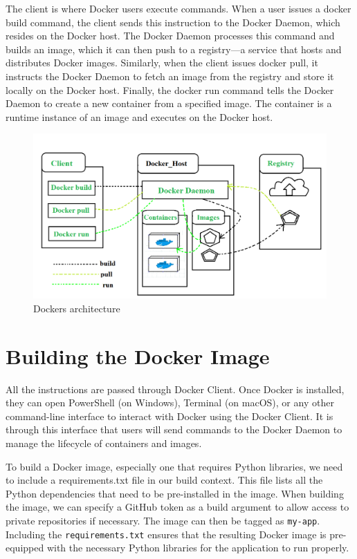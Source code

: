 \documentclass{article}
\begin{document}
The client is where Docker users execute commands. When a user issues a docker build command, the client sends this instruction to the Docker Daemon, which resides on the Docker host. The Docker Daemon processes this command and builds an image, which it can then push to a registry—a service that hosts and distributes Docker images. Similarly, when the client issues docker pull, it instructs the Docker Daemon to fetch an image from the registry and store it locally on the Docker host. Finally, the docker run command tells the Docker Daemon to create a new container from a specified image. The container is a runtime instance of an image and executes on the Docker host.

\begin{figure}[H]
\includegraphics[scale=.37]{figures/docker_architecture.png}
\caption{Dockers architecture \cite{geeksDocker}}
\label{fig:docker_arch}
\end{figure}

\section{Building the Docker Image}
All the instructions are passed through Docker Client. Once Docker is installed, they can open PowerShell (on Windows), Terminal (on macOS), or any other command-line interface to interact with Docker using the Docker Client. It is through this interface that users will send commands to the Docker Daemon to manage the lifecycle of containers and images.

To build a Docker image, especially one that requires Python libraries, we need to include a requirements.txt file in our build context. This file lists all the Python dependencies that need to be pre-installed in the image. When building the image, we can specify a GitHub token as a build argument to allow access to private repositories if necessary. The image can then be tagged as \texttt{my-app}. Including the \texttt{requirements.txt} ensures that the resulting Docker image is pre-equipped with the necessary Python libraries for the application to run properly.
\end{document}
